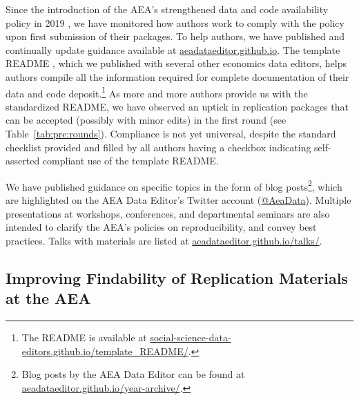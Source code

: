 \documentclass[PP]{AEA}
\begin{document}
Since the introduction of the \ac{AEA}'s strengthened data and code availability policy in 2019 \citep{10.1257/pandp.110.dcap}, we have monitored how authors work to comply with the policy upon first submission of their packages. To help authors, we have published and continually update guidance available at  \href{https://aeadataeditor.github.io/}{aeadataeditor.github.io}. The  template README \citep{READMEv1.0.0}, which we published with several other economics data editors,  helps authors compile all the information required for complete documentation of their data and code deposit.\footnote{The README is available at \href{https://social-science-data-editors.github.io/template_README/}{social-science-data-editors.github.io/template\_README/}.} As more and more authors provide us with the standardized README, we have observed an uptick in replication packages that can be accepted (possibly with minor edits) in the first round (see Table~\ref{tab:pre:rounds}). Compliance is not yet universal, despite the standard checklist provided and filled by all authors having a checkbox indicating self-asserted compliant use of the template README. 

We have published guidance on specific topics in the form of blog posts\footnote{Blog posts by the AEA Data Editor can be found at \href{https://aeadataeditor.github.io/year-archive/}{aeadataeditor.github.io/year-archive/}.}, which are highlighted on the AEA Data Editor's Twitter account (\href{https://twitter.com/AEAData}{@AeaData}). Multiple presentations at workshops, conferences, and departmental seminars are also intended to clarify the AEA's policies on reproducibility, and convey best practices. Talks with materials are listed at \href{https://aeadataeditor.github.io/talks/}{aeadataeditor.github.io/talks/}.

\subsection{Improving Findability of Replication Materials at the AEA}
\label{sec:findability}
\end{document}
